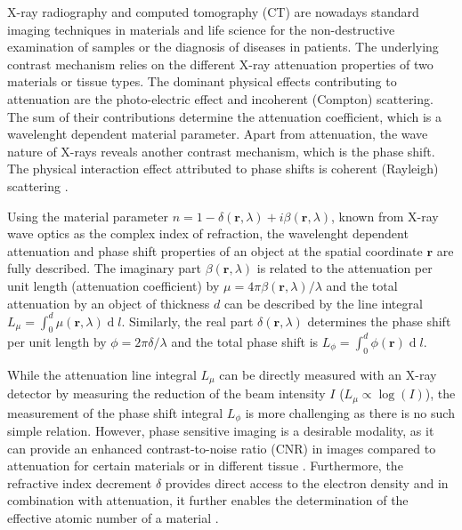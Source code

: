 \documentclass[aip,apl,amsmath,amssymb,floatfix,reprint,a4paper]{revtex4-1}
\renewcommand{\d}[1]{\ensuremath{\operatorname{d}\!{#1}}}
\begin{document}
\maketitle


X-ray radiography and computed tomography (CT) are nowadays standard imaging techniques in materials and life science for the non-destructive examination of samples or the diagnosis of diseases in patients. The underlying contrast mechanism relies on the different X-ray attenuation properties of two materials or tissue types. The dominant physical effects contributing to attenuation are the photo-electric effect and incoherent (Compton) scattering. The sum of their contributions determine the attenuation coefficient, which is a wavelenght dependent material parameter. Apart from attenuation, the wave nature of X-rays reveals another contrast mechanism, which is the phase shift. The physical interaction effect attributed to phase shifts is coherent (Rayleigh) scattering \cite{Als-Nielsen2011}.

Using the material parameter $n=1-\delta(\mathbf{r},\lambda) + i \beta(\mathbf{r},\lambda)$, known from X-ray wave optics as the complex index of refraction, the wavelenght dependent attenuation and phase shift properties of an object at the spatial coordinate $\mathbf{r}$ are fully described. The imaginary part $\beta(\mathbf{r},\lambda)$ is related to the attenuation per unit length (attenuation coefficient) by $\mu = 4 \pi \beta(\mathbf{r},\lambda) / \lambda$ and the total attenuation by an object of thickness $d$ can be described by the line integral $L_\mu = \int_0^d \mu(\mathbf{r},\lambda) \d l$. Similarly, the real part $\delta(\mathbf{r},\lambda)$ determines the phase shift per unit length by $\phi = 2 \pi \delta / \lambda$ and the total phase shift is $L_\phi = \int_0^d \phi(\mathbf{r}) \d l$.

While the attenuation line integral $L_\mu$ can be directly measured with an X-ray detector by measuring the reduction of the beam intensity $I$ ($L_\mu \propto \log(I)$), the measurement of the phase shift integral $L_\phi$ is more challenging as there is no such simple relation. However, phase sensitive imaging is a desirable modality, as it can provide an enhanced contrast-to-noise ratio (CNR) in images compared to attenuation for certain materials or in different tissue \cite{Pfeiffer2007a,McDonald2009}. Furthermore, the refractive index decrement $\delta$ provides direct access to the electron density \cite{Als-Nielsen2011} and in combination with attenuation, it further enables the determination of the effective atomic number of a material \cite{Qi2010}.
\end{document}
